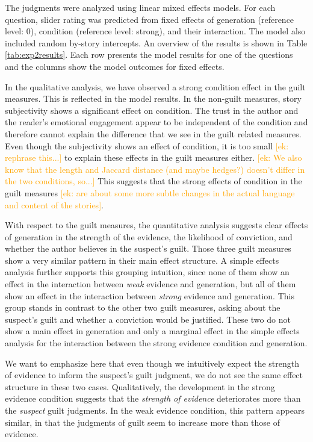 \documentclass[10pt,letterpaper]{article}
\newcommand{\ek}[1]{\textcolor{Orange}{[ek: #1]}}
\begin{document}
The judgments were analyzed using linear mixed effects models. For each question, slider rating was predicted from fixed effects of generation (reference level: 0), condition (reference level: strong), and their interaction. The model also included random by-story intercepts. An overview of the results is shown in Table \ref{tab:exp2results}. Each row presents the model results for one of the questions and the columns show the model outcomes for fixed effects.

In the qualitative analysis, we have observed a strong condition effect in the guilt measures. This is reflected in the model results. In the non-guilt measures, story subjectivity shows a significant effect on condition. The trust in the author and the reader's emotional engagement appear to be independent of the condition and therefore cannot explain the difference that we see in the guilt related measures. Even though the subjectivity shows an effect of condition, it is too small \ek{rephrase this...} to explain these effects in the guilt measures either. \ek{We also know that the length and Jaccard distance (and maybe hedges?) doesn't differ in the two conditions, so...} This suggests that the strong effects of condition in the guilt measures \ek{are about some more subtle changes in the actual language and content of the stories}.

With respect to the guilt measures, the quantitative analysis suggests clear effects of generation in the strength of the evidence, the likelihood of conviction, and whether the author believes in the suspect's guilt. Those three guilt measures show a very similar pattern in their main effect structure. A simple effects analysis further supports this grouping intuition, since none of them show an effect in the interaction between \textit{weak} evidence and generation, but all of them show an effect in the interaction between \textit{strong} evidence and generation. This group stands in contrast to the other two guilt measures, asking about the suspect's guilt and whether a conviction would be justified. These two do not show a main effect in generation and only a marginal effect in the simple effects analysis for the interaction between the strong evidence condition and generation.

We want to emphasize here that even though we intuitively expect the strength of evidence to inform the suspect's guilt judgment, we do not see the same effect structure in these two cases. Qualitatively, the development in the strong evidence condition suggests that the \textit{strength of evidence} deteriorates more than the \textit{suspect} guilt judgments. In the weak evidence condition, this pattern appears similar, in that the judgments of guilt seem to increase more than those of evidence.
\end{document}
